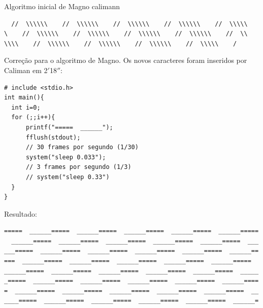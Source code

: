 \begin{example}{Algoritmo inicial de Magno calimann}
\begin{verbatim}
  //  \\\\\\    //  \\\\\\    //  \\\\\\    //  \\\\\\    //  \\\\\
\    //  \\\\\\    //  \\\\\\    //  \\\\\\    //  \\\\\\    //  \\
\\\\    //  \\\\\\    //  \\\\\\    //  \\\\\\    //  \\\\\    /
\end{verbatim}

Correção para o algoritmo de Magno. Os novos caracteres foram inseridos por Caliman em 2$'$18$''$:

\begin{verbatim}
# include <stdio.h>
int main(){
  int i=0;
  for (;;i++){
      printf("=====  ______");
      fflush(stdout);
      // 30 frames por segundo (1/30)
      system("sleep 0.033");
      // 3 frames por segundo (1/3)
      // system("sleep 0.33")
  }
}
\end{verbatim}

Resultado:

\begin{verbatim}
=====  ______=====  ______=====  ______=====  ______=====  ______=====
  ______=====  ______=====  ______=====  ______=====  ______=====  ___
___=====  ______=====  ______=====  ______=====  ______=====  ______==
===  ______=====  ______=====  ______=====  ______=====  ______=====  
______=====  ______=====  ______=====  ______=====  ______=====  _____
_=====  ______=====  ______=====  ______=====  ______=====  ______====
=  ______=====  ______=====  ______=====  ______=====  ______=====  __
____=====  ______=====  ______=====  ______=====  ______=====  ______=

\end{verbatim}
\end{example}

